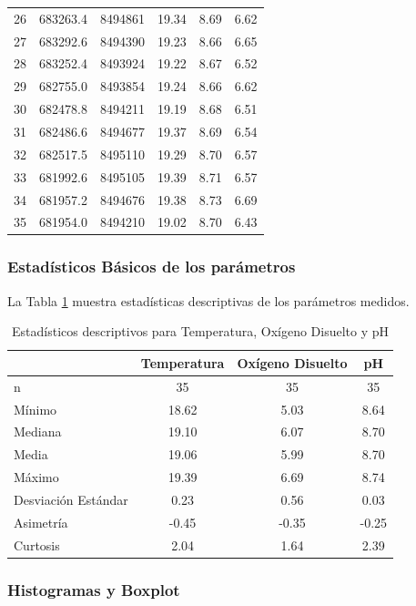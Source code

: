 \begin{table}[!htb]
\begin{tabular}{@{}cccccc@{}}
26 & 683263.4 & 8494861 & 19.34 & 8.69 & 6.62 \\
27 & 683292.6 & 8494390 & 19.23 & 8.66 & 6.65 \\
28 & 683252.4 & 8493924 & 19.22 & 8.67 & 6.52 \\
29 & 682755.0 & 8493854 & 19.24 & 8.66 & 6.62 \\
30 & 682478.8 & 8494211 & 19.19 & 8.68 & 6.51 \\
31 & 682486.6 & 8494677 & 19.37 & 8.69 & 6.54 \\
32 & 682517.5 & 8495110 & 19.29 & 8.70 & 6.57 \\
33 & 681992.6 & 8495105 & 19.39 & 8.71 & 6.57 \\
34 & 681957.2 & 8494676 & 19.38 & 8.73 & 6.69 \\
35 & 681954.0 & 8494210 & 19.02 & 8.70 & 6.43 \\ \bottomrule
\end{tabular}
\end{table}

\subsubsection{Estadísticos Básicos de los parámetros}

La Tabla \ref{tab:combined_statistics} muestra estadísticas descriptivas de los parámetros medidos.

\begin{table}[!htb]
\centering
\caption{Estadísticos descriptivos para Temperatura, Oxígeno Disuelto y pH}
\label{tab:combined_statistics}
\begin{tabular}{lccc}
\toprule
 & Temperatura & Oxígeno Disuelto & pH  \\
\midrule
n & 35 & 35 & 35 \\
Mínimo & 18.62 & 5.03 & 8.64 \\
Mediana & 19.10 & 6.07 & 8.70 \\
Media & 19.06 & 5.99 & 8.70 \\
Máximo & 19.39 & 6.69 & 8.74 \\
Desviación Estándar & 0.23 & 0.56 & 0.03 \\
Asimetría & -0.45 & -0.35 & -0.25 \\
Curtosis & 2.04 & 1.64 & 2.39 \\
\bottomrule
\end{tabular}
\end{table}

\subsubsection{Histogramas y Boxplot}

